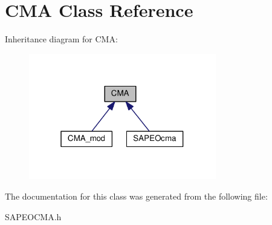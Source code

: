 \hypertarget{classCMA}{}\section{C\+MA Class Reference}
\label{classCMA}


Inheritance diagram for C\+MA\+:\nopagebreak
\begin{figure}[H]
\begin{center}
\leavevmode
\includegraphics[width=232pt]{classCMA__inherit__graph}
\end{center}
\end{figure}


The documentation for this class was generated from the following file\+:\begin{DoxyCompactItemize}
\item 
S\+A\+P\+E\+O\+C\+M\+A.\+h\end{DoxyCompactItemize}
